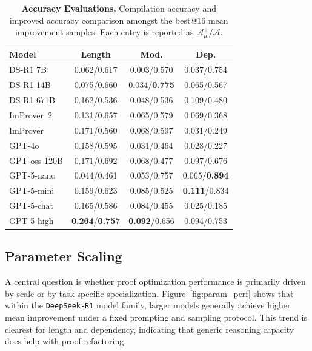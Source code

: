 \begin{table}[ht]
\centering
\caption{\textbf{Accuracy Evaluations.} Compilation accuracy and improved accuracy comparison amongst the best@16 mean improvement samples. Each entry is reported as $\mathcal{A}_\mu^+ / \mathcal{A}$.}
\label{tab:imp2_acc}
\small
\setlength{\tabcolsep}{5pt}
\begin{tabular}{l|ccc}
\toprule
\textbf{Model} & \textbf{Length} & \textbf{Mod.} & \textbf{Dep.} \\
\midrule
DS-R1 7B    & 0.062/0.617 & 0.003/0.570 & 0.037/0.754 \\
DS-R1 14B   & 0.075/0.660 & 0.034/\textbf{0.775} & 0.065/0.567 \\
DS-R1 671B  & 0.162/0.536 & 0.048/0.536 & 0.109/0.480 \\
\midrule
ImProver~2  & 0.131/0.657 & 0.065/0.579 & 0.069/0.368 \\
\midrule
ImProver            & 0.171/0.560 & 0.068/0.597 & 0.031/0.249 \\
GPT-4o              & 0.158/0.595 & 0.031/0.464 & 0.028/0.227 \\
GPT-oss-120B        & 0.171/0.692 & 0.068/0.477 & 0.097/0.676 \\
GPT-5-nano          & 0.044/0.461 & 0.053/0.757 & 0.065/\textbf{0.894} \\
GPT-5-mini          & 0.159/0.623 & 0.085/0.525 & \textbf{0.111}/0.834 \\
GPT-5-chat          & 0.165/0.586 & 0.084/0.455 & 0.025/0.185 \\
GPT-5-high          & \textbf{0.264}/\textbf{0.757} & \textbf{0.092}/0.656 & 0.094/0.753 \\
\bottomrule
\end{tabular}
\end{table}


\subsection{Parameter Scaling}
\label{sec:imp2_scaling}

A central question is whether proof optimization performance is primarily driven by scale or by task-specific specialization. Figure~\ref{fig:param_perf} shows that within the \texttt{DeepSeek-R1} model family, larger models generally achieve higher mean improvement under a fixed prompting and sampling protocol. This trend is clearest for length and dependency, indicating that generic reasoning capacity does help with proof refactoring.

